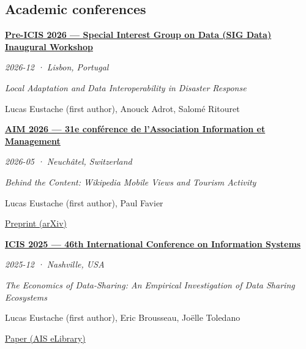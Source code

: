 \documentclass[11pt,a4paper]{article}
\newlength{\cvindent}
\newenvironment{cvblock}[1][1]{%
  \par\noindent\hspace*{#1\cvindent}%
  \begin{minipage}{\dimexpr\linewidth-#1\cvindent\relax}%
}{%
  \end{minipage}\par
}
\newenvironment{cvdetails}{%
  \begin{list}{}{%
    \setlength{\leftmargin}{\cvindent}%
    \setlength{\rightmargin}{0pt}%
    \setlength{\topsep}{0.1em}%
    \setlength{\partopsep}{0pt}%
    \setlength{\parsep}{0.05em}%
    \setlength{\itemsep}{0pt}%
  }\item[]\small\ignorespaces
}{%
  \end{list}
}
\begin{document}
\subsection*{Academic conferences}
\begin{cvblock}[2]
\textbf{\href{https://communities.aisnet.org/data/data-events/inaugural-workshop-in-icis-2026-lisbon}{Pre-ICIS 2026 --- Special Interest Group on Data (SIG Data) Inaugural Workshop}}\par
\begin{cvdetails}
{\small\itshape 2026-12 · Lisbon, Portugal}\par
\textit{Local Adaptation and Data Interoperability in Disaster Response}\par
{\small Lucas Eustache (first author), Anouck Adrot, Salomé Ritouret}\par
\end{cvdetails}
\end{cvblock}\par\vspace{0.35em}

\begin{cvblock}[2]
\textbf{\href{https://aim2026.sciencesconf.org/}{AIM 2026 --- 31e conférence de l'Association Information et Management}}\par
\begin{cvdetails}
{\small\itshape 2026-05 · Neuchâtel, Switzerland}\par
\textit{Behind the Content: Wikipedia Mobile Views and Tourism Activity}\par
{\small Lucas Eustache (first author), Paul Favier}\par
\href{https://arxiv.org/abs/2606.29991}{Preprint (arXiv)}\par
\end{cvdetails}
\end{cvblock}\par\vspace{0.35em}

\begin{cvblock}[2]
\textbf{\href{https://aisel.aisnet.org/icis2025/sharing_econ/sharing_econ/6/}{ICIS 2025 --- 46th International Conference on Information Systems}}\par
\begin{cvdetails}
{\small\itshape 2025-12 · Nashville, USA}\par
\textit{The Economics of Data-Sharing: An Empirical Investigation of Data Sharing Ecosystems}\par
{\small Lucas Eustache (first author), Eric Brousseau, Joëlle Toledano}\par
\href{https://aisel.aisnet.org/icis2025/sharing_econ/sharing_econ/6/}{Paper (AIS eLibrary)}\par
\end{cvdetails}
\end{cvblock}\par\vspace{0.35em}
\end{document}
